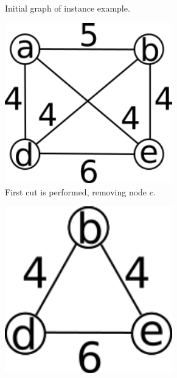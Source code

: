\begin{figure}[!h]
\begin{subfigure}[b]{0.3\textwidth}
			 \caption{Initial graph of instance example.}
			 \label{fig:sca1}
	 \end{subfigure}
	 \hspace{3mm}
	 \begin{subfigure}[b]{0.3\textwidth}
			 \centering
			 \includegraphics[width=0.8\textwidth]{img/sca2.png}
			 \caption{First cut is performed, removing node $c$.}
			 \label{fig:sca2}
	 \end{subfigure}
	 \par\bigskip
	 \begin{subfigure}[b]{0.3\textwidth}
			 \centering
			 \includegraphics[width=0.8\textwidth]{img/sca3.png}

\end{subfigure}
\end{figure}
